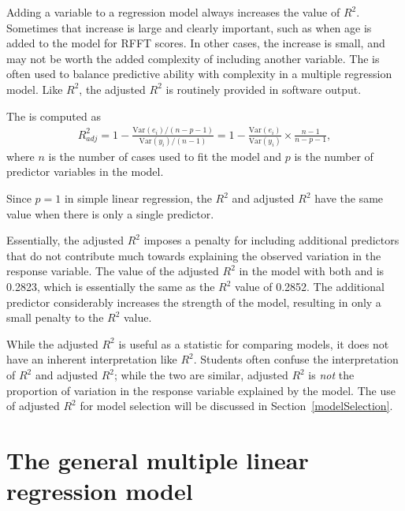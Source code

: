 Adding a variable to a regression model always increases the value of $R^2$. Sometimes that increase is large and clearly important, such as when age is added to the model for RFFT scores. In other cases, the increase is small, and may not be worth the added complexity of including another variable. The  is often used to balance predictive ability with complexity in a multiple regression model. Like $R^2$, the adjusted $R^2$ is routinely provided in software output. 

\begin{termBox}{
The  is computed as
\begin{align*}
R_{adj}^{2} = 1-\frac{\text{Var}(e_i) / (n-p-1)}{\text{Var}(y_i) / (n-1)}
	= 1-\frac{\text{Var}(e_i)}{\text{Var}(y_i)} \times
    \frac{n-1}{n-p-1},
\end{align*}
where $n$ is the number of cases used to fit the model and $p$ is the number of predictor variables in the model.}
\end{termBox}

Since $p = 1$ in simple linear regression, the $R^2$ and adjusted $R^2$ have the same value when there is only a single predictor. 

Essentially, the adjusted $R^2$ imposes a penalty for including additional predictors that do not contribute much towards explaining the observed variation in the response variable. The value of the adjusted $R^2$ in the model with both  and  is 0.2823, which is essentially the same as the $R^2$ value of 0.2852. The additional predictor  considerably increases the strength of the model, resulting in only a small penalty to the $R^2$ value.

While the adjusted $R^2$ is useful as a statistic for comparing models, it does not have an inherent interpretation like $R^2$. Students often confuse the interpretation of $R^2$ and adjusted $R^2$; while the two are similar, adjusted $R^2$ is \emph{not} the proportion of variation in the response variable explained by the model. The use of adjusted $R^2$ for model selection will be discussed in Section~\ref{modelSelection}.

 
\section{The general multiple linear regression model}
\label{generalMultipleRegression}
 
